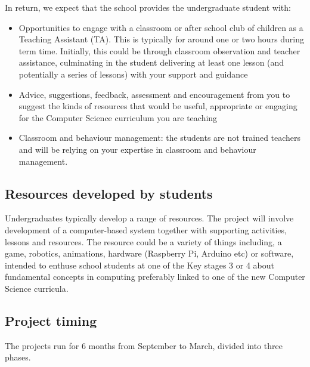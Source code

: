 \documentclass[
  12pt,
]{book}
\providecommand{\tightlist}{%
  \setlength{\itemsep}{0pt}\setlength{\parskip}{0pt}}
\begin{document}
In return, we expect that the school provides the undergraduate student with:

\begin{itemize}
\tightlist
\item
  Opportunities to engage with a classroom or after school club of children as a Teaching Assistant (TA). This is typically for around one or two hours during term time. Initially, this could be through classroom observation and teacher assistance, culminating in the student delivering at least one lesson (and potentially a series of lessons) with your support and guidance
\item
  Advice, suggestions, feedback, assessment and encouragement from you to suggest the kinds of resources that would be useful, appropriate or engaging for the Computer Science curriculum you are teaching
\item
  Classroom and behaviour management: the students are not trained teachers and will be relying on your expertise in classroom and behaviour management.
\end{itemize}

\hypertarget{resources-developed-by-students}{%
\subsection{Resources developed by students}\label{resources-developed-by-students}}

Undergraduates typically develop a range of resources. The project will involve development of a computer-based system together with supporting activities, lessons and resources. The resource could be a variety of things including, a game, robotics, animations, hardware (Raspberry Pi, Arduino etc) or software, intended to enthuse school students at one of the Key stages 3 or 4 about fundamental concepts in computing preferably linked to one of the new Computer Science curricula.

\hypertarget{project-timing}{%
\subsection{Project timing}\label{project-timing}}

The projects run for 6 months from September to March, divided into three phases.
\end{document}
